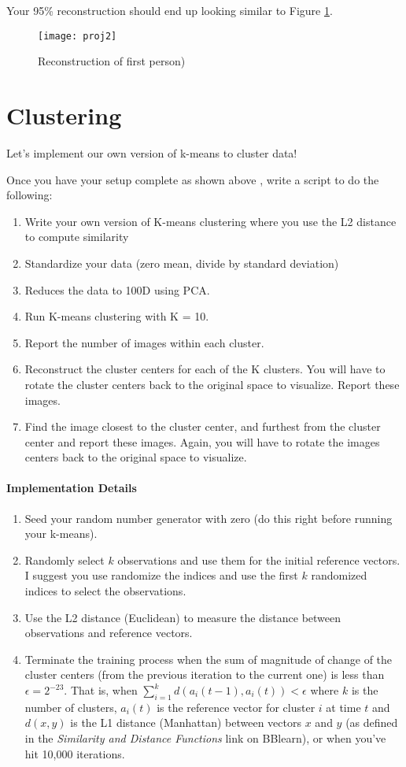 \documentclass[12pt]{article}
\begin{document}
Your 95\% reconstruction should end up looking similar to Figure \ref{recon3}.
\begin{figure}[H]
\begin{center}
\texttt{[image: proj2]}
\caption{Reconstruction of first person)}
\label{recon3}
\end{center}
\end{figure}


\newpage
\section{Clustering}
Let's implement our own version of k-means to cluster data!

Once you have your setup complete as shown above , write a script to do the following:
\begin{enumerate}
  \item Write your own version of K-means clustering where you use the L2 distance to compute similarity
  \item Standardize your data (zero mean, divide by standard deviation)
  \item Reduces the data to 100D using PCA. 
  \item Run K-means clustering with K = 10.
   \item Report the number of images within each cluster.
  \item Reconstruct the cluster centers for each of the K clusters.  You will have to rotate the cluster centers back to the original space to visualize.  Report these images.
   \item Find the image closest to the cluster center, and furthest from the cluster center and report these images.  Again, you will have to rotate the images centers back to the original space to visualize. 
\end{enumerate}

\noindent
\paragraph{Implementation Details}
\begin{enumerate}
\item Seed your random number generator with zero (do this right before running your k-means). 
\item Randomly select $k$ observations and use them for the initial reference vectors.  I suggest you use randomize the indices and use the first $k$ randomized indices to select the observations.
\item Use the L2 distance (Euclidean) to measure the distance between observations and reference vectors. 
\item Terminate the training process when the sum of magnitude of change of the cluster centers (from the previous iteration to the current one) is less than $\epsilon=2^{-23}$.  That is, when $\sum_{i=1}^k d(a_i(t-1),a_i(t))<\epsilon$ where $k$ is the number of clusters, $a_i(t)$ is the reference vector for cluster $i$ at time $t$ and $d(x,y)$ is the L1 distance (Manhattan) between vectors $x$ and $y$ (as defined in the \emph{Similarity and Distance Functions} link on BBlearn), or when you've hit 10,000 iterations.
\end{enumerate}
\end{document}
